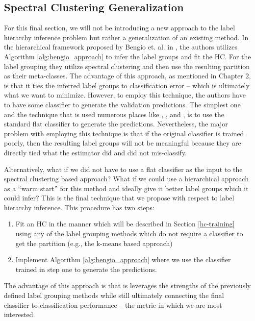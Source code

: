 \documentclass[../thesis.tex]{subfiles}
\begin{document}
\subsection{Spectral Clustering Generalization}
For this final section, we will not be introducing a new approach to the label
hierarchy inference problem but rather a generalization of an existing method.
In the hierarchical framework proposed by Bengio et. al. in
\cite{bengio2010label}, the authors utilizes Algorithm \ref{alg:bengio_approach}
to infer the label groups and fit the HC. For the label grouping they utilize
spectral clustering and then use the resulting partition as their meta-classes.
The advantage of this approach, as mentioned in Chapter 2, is that it ties the
inferred label groups to classification error -- which is ultimately what we
want to minimize. However, to employ this technique, the authors have to have
some classifier to generate the validation predictions. The simplest one and the
technique that is used numerous places like \cite{bengio2010label},
\cite{yan2015hd}, and \cite{wang2018learning}, is to use the standard flat
classifier to generate the predictions. Nevertheless, the major problem with
employing this technique is that if the original classifier is trained poorly,
then the resulting label groups will not be meaningful because they are directly
tied what the estimator did and did not mis-classify.

Alternatively, what if we did not have to use a flat classifier as the input to
the spectral clustering based approach? What if we could use a hierarchical
approach as a ``warm start'' for this method and ideally give it better label
groups which it could infer? This is the final technique that we propose with
respect to label hierarchy inference. This procedure has two steps:
\begin{enumerate}
    \item Fit an HC in the manner which will be described in Section
    \ref{hc-training} using any of the label grouping methods which do not
    require a classifier to get the partition (e.g., the k-means based approach)
    \item Implement Algorithm \ref{alg:bengio_approach} where we use the
    classifier trained in step one to generate the predictions.
\end{enumerate}

The advantage of this approach is that is leverages the strengths of the
previously defined label grouping methods while still ultimately connecting the
final classifier to classification performance -- the metric in which we are
most interested.
\end{document}

